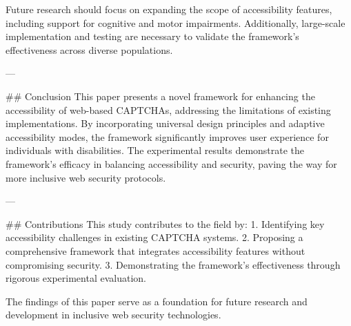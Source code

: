 Future research should focus on expanding the scope of accessibility features, including support for cognitive and motor impairments. Additionally, large-scale implementation and testing are necessary to validate the framework's effectiveness across diverse populations.

---

## Conclusion
This paper presents a novel framework for enhancing the accessibility of web-based CAPTCHAs, addressing the limitations of existing implementations. By incorporating universal design principles and adaptive accessibility modes, the framework significantly improves user experience for individuals with disabilities. The experimental results demonstrate the framework's efficacy in balancing accessibility and security, paving the way for more inclusive web security protocols.

---

## Contributions
This study contributes to the field by:
1. Identifying key accessibility challenges in existing CAPTCHA systems.
2. Proposing a comprehensive framework that integrates accessibility features without compromising security.
3. Demonstrating the framework's effectiveness through rigorous experimental evaluation.

The findings of this paper serve as a foundation for future research and development in inclusive web security technologies.